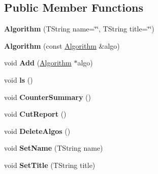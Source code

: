 \subsection*{Public Member Functions}
\begin{DoxyCompactItemize}
\item 
\hypertarget{class_h_a_l_1_1_algorithm_a50506c07b5959ecd740f5683bf50ea93}{{\bfseries Algorithm} (T\+String name=\char`\"{}\char`\"{}, T\+String title=\char`\"{}\char`\"{})}\label{class_h_a_l_1_1_algorithm_a50506c07b5959ecd740f5683bf50ea93}

\item 
\hypertarget{class_h_a_l_1_1_algorithm_a77b66292cc2f8e021ed819daebbd7c51}{{\bfseries Algorithm} (const \hyperlink{class_h_a_l_1_1_algorithm}{Algorithm} \&algo)}\label{class_h_a_l_1_1_algorithm_a77b66292cc2f8e021ed819daebbd7c51}

\item 
\hypertarget{class_h_a_l_1_1_algorithm_a6e6834d936897cd573ce858d9b26150e}{void {\bfseries Add} (\hyperlink{class_h_a_l_1_1_algorithm}{Algorithm} $\ast$algo)}\label{class_h_a_l_1_1_algorithm_a6e6834d936897cd573ce858d9b26150e}

\item 
\hypertarget{class_h_a_l_1_1_algorithm_aaadc2f897f854c3808753fe8bdc88507}{void {\bfseries ls} ()}\label{class_h_a_l_1_1_algorithm_aaadc2f897f854c3808753fe8bdc88507}

\item 
\hypertarget{class_h_a_l_1_1_algorithm_ac6dda46e3df39cc169aaf95ced0507df}{void {\bfseries Counter\+Summary} ()}\label{class_h_a_l_1_1_algorithm_ac6dda46e3df39cc169aaf95ced0507df}

\item 
\hypertarget{class_h_a_l_1_1_algorithm_ae989038537a82ae182821bf32036a15b}{void {\bfseries Cut\+Report} ()}\label{class_h_a_l_1_1_algorithm_ae989038537a82ae182821bf32036a15b}

\item 
\hypertarget{class_h_a_l_1_1_algorithm_a5a25656c41939992b7a701f9f6c22476}{void {\bfseries Delete\+Algos} ()}\label{class_h_a_l_1_1_algorithm_a5a25656c41939992b7a701f9f6c22476}

\item 
\hypertarget{class_h_a_l_1_1_algorithm_a7815cd340c0800cd2b5567814bbcc40a}{void {\bfseries Set\+Name} (T\+String name)}\label{class_h_a_l_1_1_algorithm_a7815cd340c0800cd2b5567814bbcc40a}

\item 
\hypertarget{class_h_a_l_1_1_algorithm_aa225c7fa0c6fdef7a2807c3eaa225d83}{void {\bfseries Set\+Title} (T\+String title)}\label{class_h_a_l_1_1_algorithm_aa225c7fa0c6fdef7a2807c3eaa225d83}


\end{DoxyCompactItemize}
